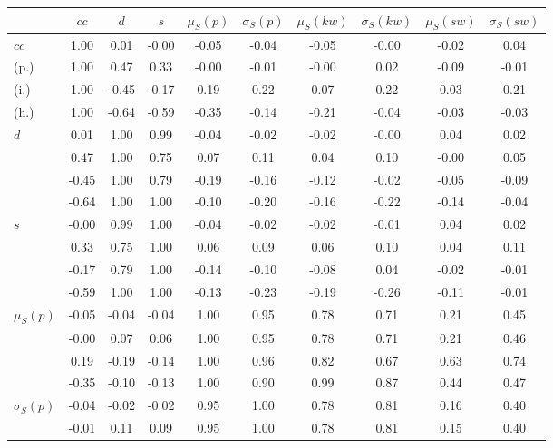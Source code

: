 \begin{table*}[h!]
\begin{center}
\begin{tabular}{| l | c | c | c | c | c | c | c | c | c |}\hline
 & $cc$ & $d$ & $s$ & $\mu_S(p)$ & $\sigma_S(p)$ & $\mu_S(kw)$ & $\sigma_S(kw)$ & $\mu_S(sw)$ & $\sigma_S(sw)$ \\\hline
$cc$ & 1.00  & 0.01  & -0.00  & -0.05  & -0.04  & -0.05  & -0.00  & -0.02  & 0.04 \\\hline
(p.) & 1.00  & 0.47  & 0.33  & -0.00  & -0.01  & -0.00  & 0.02  & -0.09  & -0.01 \\\hline
(i.) & 1.00  & -0.45  & -0.17  & 0.19  & 0.22  & 0.07  & 0.22  & 0.03  & 0.21 \\\hline
(h.) & 1.00  & -0.64  & -0.59  & -0.35  & -0.14  & -0.21  & -0.04  & -0.03  & -0.03 \\\hline
$d$ & 0.01  & 1.00  & 0.99  & -0.04  & -0.02  & -0.02  & -0.00  & 0.04  & 0.02 \\\hline
 & 0.47  & 1.00  & 0.75  & 0.07  & 0.11  & 0.04  & 0.10  & -0.00  & 0.05 \\\hline
 & -0.45  & 1.00  & 0.79  & -0.19  & -0.16  & -0.12  & -0.02  & -0.05  & -0.09 \\\hline
 & -0.64  & 1.00  & 1.00  & -0.10  & -0.20  & -0.16  & -0.22  & -0.14  & -0.04 \\\hline
$s$ & -0.00  & 0.99  & 1.00  & -0.04  & -0.02  & -0.02  & -0.01  & 0.04  & 0.02 \\\hline
 & 0.33  & 0.75  & 1.00  & 0.06  & 0.09  & 0.06  & 0.10  & 0.04  & 0.11 \\\hline
 & -0.17  & 0.79  & 1.00  & -0.14  & -0.10  & -0.08  & 0.04  & -0.02  & -0.01 \\\hline
 & -0.59  & 1.00  & 1.00  & -0.13  & -0.23  & -0.19  & -0.26  & -0.11  & -0.01 \\\hline
$\mu_S(p)$ & -0.05  & -0.04  & -0.04  & 1.00  & 0.95  & 0.78  & 0.71  & 0.21  & 0.45 \\\hline
 & -0.00  & 0.07  & 0.06  & 1.00  & 0.95  & 0.78  & 0.71  & 0.21  & 0.46 \\\hline
 & 0.19  & -0.19  & -0.14  & 1.00  & 0.96  & 0.82  & 0.67  & 0.63  & 0.74 \\\hline
 & -0.35  & -0.10  & -0.13  & 1.00  & 0.90  & 0.99  & 0.87  & 0.44  & 0.47 \\\hline
$\sigma_S(p)$ & -0.04  & -0.02  & -0.02  & 0.95  & 1.00  & 0.78  & 0.81  & 0.16  & 0.40 \\\hline
 & -0.01  & 0.11  & 0.09  & 0.95  & 1.00  & 0.78  & 0.81  & 0.15  & 0.40 \\\hline

\end{tabular}
\end{center}
\end{table*}

